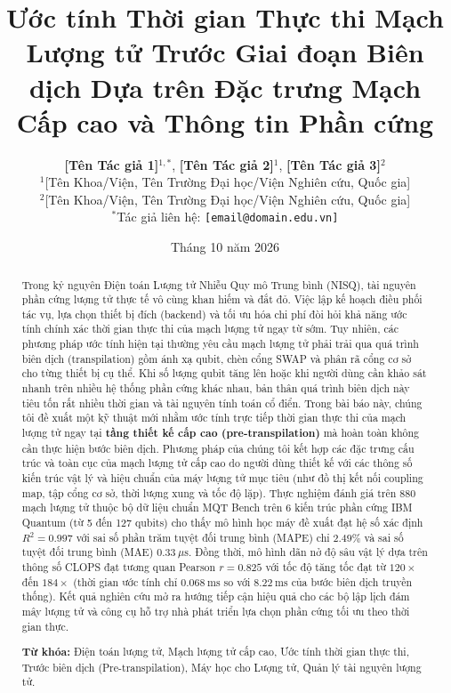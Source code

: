 \documentclass[11pt, a4paper]{article}
\title{\textbf{Ước tính Thời gian Thực thi Mạch Lượng tử Trước Giai đoạn Biên dịch Dựa trên Đặc trưng Mạch Cấp cao và Thông tin Phần cứng}}
\author{
    \textbf{[Tên Tác giả 1]}$^{1,*}$, \textbf{[Tên Tác giả 2]}$^{1}$, \textbf{[Tên Tác giả 3]}$^{2}$ \\
    \small $^{1}$[Tên Khoa/Viện, Tên Trường Đại học/Viện Nghiên cứu, Quốc gia] \\
    \small $^{2}$[Tên Khoa/Viện, Tên Trường Đại học/Viện Nghiên cứu, Quốc gia] \\
    \small $^{*}$Tác giả liên hệ: \texttt{[email@domain.edu.vn]}
}
\date{Tháng 10 năm 2026}
\begin{document}
\maketitle

\begin{abstract}
\noindent
Trong kỷ nguyên Điện toán Lượng tử Nhiễu Quy mô Trung bình (NISQ), tài nguyên phần cứng lượng tử thực tế vô cùng khan hiếm và đắt đỏ. Việc lập kế hoạch điều phối tác vụ, lựa chọn thiết bị đích (backend) và tối ưu hóa chi phí đòi hỏi khả năng ước tính chính xác thời gian thực thi của mạch lượng tử ngay từ sớm. Tuy nhiên, các phương pháp ước tính hiện tại thường yêu cầu mạch lượng tử phải trải qua quá trình biên dịch (transpilation) gồm ánh xạ qubit, chèn cổng SWAP và phân rã cổng cơ sở cho từng thiết bị cụ thể. Khi số lượng qubit tăng lên hoặc khi người dùng cần khảo sát nhanh trên nhiều hệ thống phần cứng khác nhau, bản thân quá trình biên dịch này tiêu tốn rất nhiều thời gian và tài nguyên tính toán cổ điển. Trong bài báo này, chúng tôi đề xuất một kỹ thuật mới nhằm ước tính trực tiếp thời gian thực thi của mạch lượng tử ngay tại \textbf{tầng thiết kế cấp cao (pre-transpilation)} mà hoàn toàn không cần thực hiện bước biên dịch. Phương pháp của chúng tôi kết hợp các đặc trưng cấu trúc và toàn cục của mạch lượng tử cấp cao do người dùng thiết kế với các thông số kiến trúc vật lý và hiệu chuẩn của máy lượng tử mục tiêu (như đồ thị kết nối coupling map, tập cổng cơ sở, thời lượng xung và tốc độ lặp). Thực nghiệm đánh giá trên 880 mạch lượng tử thuộc bộ dữ liệu chuẩn MQT Bench trên 6 kiến trúc phần cứng IBM Quantum (từ 5 đến 127 qubits) cho thấy mô hình học máy đề xuất đạt hệ số xác định $R^2 = 0.997$ với sai số phần trăm tuyệt đối trung bình (MAPE) chỉ $2.49\%$ và sai số tuyệt đối trung bình (MAE) $0.33~\mu\text{s}$. Đồng thời, mô hình dãn nở độ sâu vật lý dựa trên thông số CLOPS đạt tương quan Pearson $r = 0.825$ với tốc độ tăng tốc đạt từ $120\times$ đến $184\times$ (thời gian ước tính chỉ $0.068~\text{ms}$ so với $8.22~\text{ms}$ của bước biên dịch truyền thống). Kết quả nghiên cứu mở ra hướng tiếp cận hiệu quả cho các bộ lập lịch đám mây lượng tử và công cụ hỗ trợ nhà phát triển lựa chọn phần cứng tối ưu theo thời gian thực.

\vspace{0.3cm}
\noindent \textbf{Từ khóa:} Điện toán lượng tử, Mạch lượng tử cấp cao, Ước tính thời gian thực thi, Trước biên dịch (Pre-transpilation), Máy học cho Lượng tử, Quản lý tài nguyên lượng tử.
\end{abstract}
\end{document}
